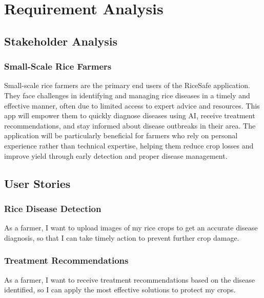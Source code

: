 \chapter{Requirement Analysis}
\label{chap:requirement-analysis}

\section{Stakeholder Analysis}
\label{section:stakeholder-analysis}

\subsection{Small-Scale Rice Farmers}
\label{subsection:small-scale-rice-farmers}

Small-scale rice farmers are the primary end users of the RiceSafe application. They face challenges in identifying and managing rice diseases in a timely and effective manner, often due to limited access to expert advice and resources. This app will empower them to quickly diagnose diseases using AI, receive treatment recommendations, and stay informed about disease outbreaks in their area. The application will be particularly beneficial for farmers who rely on personal experience rather than technical expertise, helping them reduce crop losses and improve yield through early detection and proper disease management.

\section{User Stories}
\label{section:user-stories}

\subsection{Rice Disease Detection}
\label{subsection:rice-disease-detection}

As a farmer, I want to upload images of my rice crops to get an accurate disease diagnosis, so that I can take timely action to prevent further crop damage.

\subsection{Treatment Recommendations}
\label{subsection:treatment-recommendations}

As a farmer, I want to receive treatment recommendations based on the disease identified, so I can apply the most effective solutions to protect my crops.

